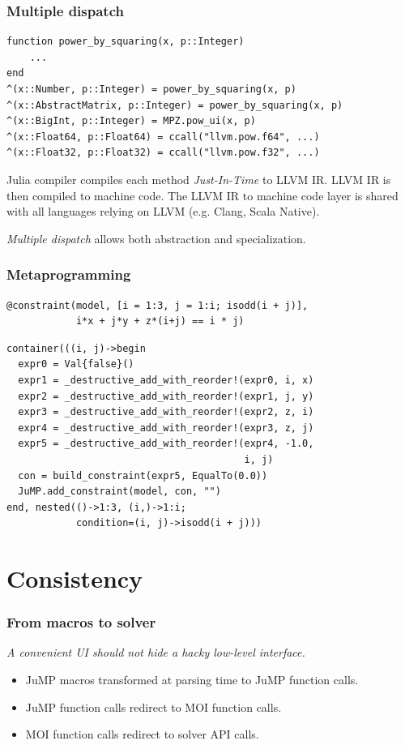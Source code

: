 \documentclass{beamer}
\begin{document}
  \begin{frame}[fragile]
    \frametitle{Multiple dispatch}
    \begin{verbatim}
function power_by_squaring(x, p::Integer)
    ...
end
^(x::Number, p::Integer) = power_by_squaring(x, p)
^(x::AbstractMatrix, p::Integer) = power_by_squaring(x, p)
^(x::BigInt, p::Integer) = MPZ.pow_ui(x, p)
^(x::Float64, p::Float64) = ccall("llvm.pow.f64", ...)
^(x::Float32, p::Float32) = ccall("llvm.pow.f32", ...)
    \end{verbatim}

    Julia compiler compiles each method \emph{Just-In-Time} to LLVM IR.
    LLVM IR is then compiled to machine code.
    The LLVM IR to machine code layer is shared with all languages relying on LLVM (e.g. Clang, Scala Native).

    \emph{Multiple dispatch} allows both \alert{abstraction} and \alert{specialization}.
  \end{frame}

  \begin{frame}[fragile]
\frametitle{Metaprogramming}
\begin{verbatim}
@constraint(model, [i = 1:3, j = 1:i; isodd(i + j)],
            i*x + j*y + z*(i+j) == i * j)
\end{verbatim}
\begin{verbatim}
container(((i, j)->begin
  expr0 = Val{false}()
  expr1 = _destructive_add_with_reorder!(expr0, i, x)
  expr2 = _destructive_add_with_reorder!(expr1, j, y)
  expr3 = _destructive_add_with_reorder!(expr2, z, i)
  expr4 = _destructive_add_with_reorder!(expr3, z, j)
  expr5 = _destructive_add_with_reorder!(expr4, -1.0,
                                         i, j)
  con = build_constraint(expr5, EqualTo(0.0))
  JuMP.add_constraint(model, con, "")
end, nested(()->1:3, (i,)->1:i;
            condition=(i, j)->isodd(i + j)))
\end{verbatim}
  \end{frame}


\section{Consistency}

  \begin{frame}
    \frametitle{From macros to solver}
    \begin{center}
      \emph{A convenient UI should not hide a hacky low-level interface.}
    \end{center}
    \begin{itemize}
      \item JuMP macros transformed at parsing time to JuMP function calls.
      \item JuMP function calls redirect to MOI function calls.
      \item MOI function calls redirect to solver API calls.
    \end{itemize}
  \end{frame}
\end{document}
